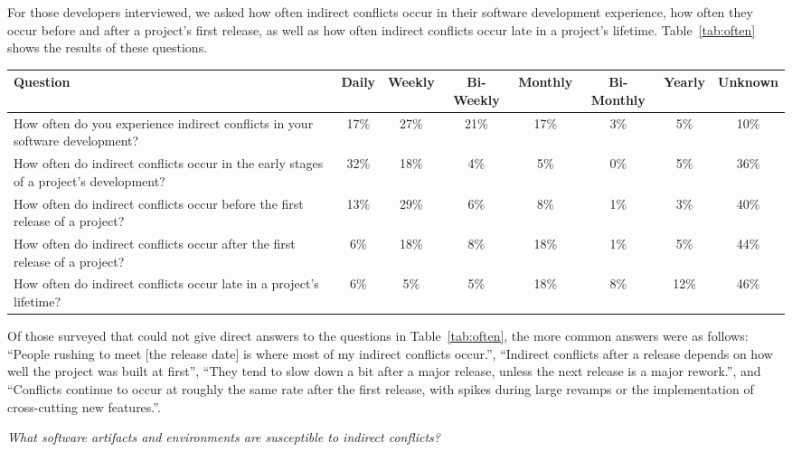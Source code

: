 \documentclass[conference]{IEEEtran}
\begin{document}
For those developers interviewed, we asked how often indirect conflicts occur in their software development experience,
how often they occur before and after a project's first release, as well as how often indirect conflicts occur late
in a project's lifetime. Table~\ref{tab:often} shows the results of these questions.

\begin{table*}[tb!]
\begin{center}
\begin{tabular}{| p{7cm} | c | c | c | c | c | c | c |}
\hline
Question & Daily & Weekly & Bi-Weekly & Monthly & Bi-Monthly & Yearly & Unknown \\
\hline
\hline
How often do you experience indirect conflicts in your software development? & 17\% & 27\% & 21\% & 17\% & 3\% & 5\% & 10\% \\ \hline
How often do indirect conflicts occur in the early stages of a project’s development? & 32\% & 18\% & 4\% & 5\% & 0\% & 5\% & 36\% \\ \hline
How often do indirect conflicts occur before the first release of a project? & 13\% & 29\% & 6\% & 8\% & 1\% & 3\% & 40\% \\ \hline
How often do indirect conflicts occur after the first release of a project? & 6\% & 18\% & 8\% & 18\% & 1\% & 5\% & 44\% \\ \hline
How often do indirect conflicts occur late in a project’s lifetime? & 6\% & 5\% & 5\% & 18\% & 8\% & 12\% & 46\% \\ \hline
\end{tabular}
\end{center}
\caption{Results of survey questions to how often indirect conflicts occur, in terms of percentage
of developers surveyed.\label{tab:often}}
\end{table*}

Of those surveyed that could not give direct answers to the questions in Table~\ref{tab:often}, the more common answers were 
as follows: ``People rushing to meet [the release date] is where most of my indirect conflicts occur.'', ``Indirect conflicts
after a release depends on how well the project was built at first'', ``They tend to slow down a bit after a major release, 
unless the next release is a major rework.'', and ``Conflicts continue to occur at roughly the same rate after the first release,
with spikes during large revamps or the implementation of cross-cutting new features.''.

\begin{description}[topsep=6pt]
	\item[RQ3] \textit{What software artifacts and environments are susceptible to indirect conflicts?}
\end{description}
\end{document}

